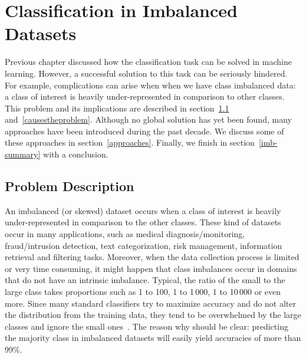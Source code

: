 \chapter{Classification in Imbalanced Datasets}\label{imbalanced}
Previous chapter discussed how the classification task can be solved in machine learning. However, a successful solution to this task can be seriously hindered. For example, complications can arise when when we have class imbalanced data: a class of interest is heavily under-represented in comparison to other classes. This problem and its implications are described in section~\ref{imbalanced-theproblem} and~\ref{causestheproblem}. Although no global solution has yet been found, many approaches have been introduced during the past decade. We discuss some of these approaches in section~\ref{approaches}. Finally, we finish in section~\ref{imb-summary} with a conclusion.


\section{Problem Description}\label{imbalanced-theproblem}
An imbalanced (or skewed) dataset occurs when a class of interest is heavily under-represented in comparison to the other classes.  These kind of datasets occur in many applications, such as medical diagnosis/monitoring, fraud/intrusion detection, text categorization, risk management, information retrieval and filtering tasks.  Moreover, when the data collection process is limited or very time consuming, it might happen that class imbalances occur in domains that do not have an intrinsic imbalance.  Typical, the ratio of the small to the large class takes proportions such as 1 to 100, 1 to 1\,000, 1 to 10\,000 or even more. Since many standard classifiers try to maximize accuracy and do not alter the distribution from the training data, they tend to be overwhelmed by the large classes and ignore the small ones~\cite{ProvostMLID}. The reason why should be clear: predicting the majority class in imbalanced datasets will easily yield accuracies of more than 99\%. 

